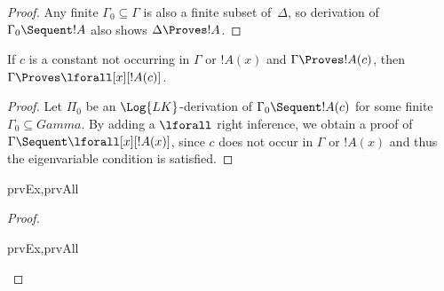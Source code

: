 \documentclass[../../include/open-logic-section]{subfiles}
\begin{document}
\begin{proof}
Any finite $\Gamma_0 \subseteq \Gamma$ is also a finite subset
of~$\Delta$, so derivation of $\Gamma_0 \Sequent !A$ also shows
$\Delta \Proves !A$.
\end{proof}

\begin{thm}
 If $c$ is a constant not occurring
in $\Gamma$ or $!A(x)$ and $\Gamma \Proves !A(c)$, then $\Gamma
\Proves \lforall[x][!A(c)]$.
\end{thm}

\begin{proof}
Let $\Pi_0$ be an $\Log{LK}$-derivation of $\Gamma_0 \Sequent !A(c)$
for some finite $\Gamma_0 \subseteq Gamma$.  By adding a $\lforall$
right inference, we obtain a proof of $\Gamma \Sequent
\lforall[x][!A(x)]$, since $c$ does not occur in $\Gamma$ or $!A(x)$
and thus the eigenvariable condition is satisfied.
\end{proof}

\begin{thm}
\begin{tagenumerate}{prvEx,prvAll}

\end{tagenumerate}
\end{thm}

\begin{proof}
\begin{tagenumerate}{prvEx,prvAll}
\end{tagenumerate}
\end{proof}
\end{document}
